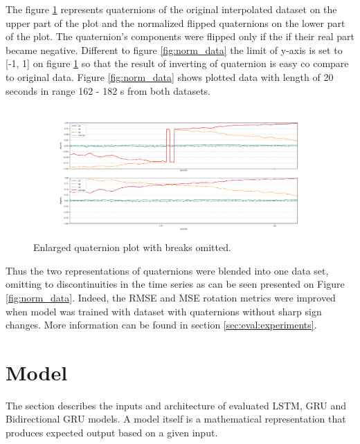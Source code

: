  The figure \ref{fig:compare} represents quaternions of the original interpolated dataset on the upper part of the plot and the normalized flipped quaternions on the lower part of the plot. The quaternion's components were flipped only if the if their real part became negative. Different to figure \ref{fig:norm_data} the limit of y-axis is set to [-1, 1] on figure \ref{fig:compare} so that the result of inverting of quaternion is easy co compare to original data. Figure \ref{fig:norm_data} shows plotted data with length of 20 seconds in range 162 - 182 s from both datasets.
\begin{figure}[htb]
	\begin{center}
		\includegraphics[width=1\textwidth, keepaspectratio]{gfx/Fig-1556-compare.pdf}
		\caption{\label{fig:compare} Enlarged quaternion plot with breaks omitted.}
	\end{center}
\end{figure}

Thus the two representations of quaternions were blended into one data set, omitting to discontinuities in the time series as can be seen presented on Figure \ref{fig:norm_data}. Indeed, the RMSE and MSE rotation metrics were improved when model was trained with dataset with quaternions without sharp sign changes. More information can be found in section \ref{sec:eval:experiments}.

\section{Model}
\label{sec:impl:model}
The section describes the inputs and architecture of evaluated LSTM, GRU and Bidirectional GRU models. A model itself is a mathematical representation that produces expected output based on a given input. 

